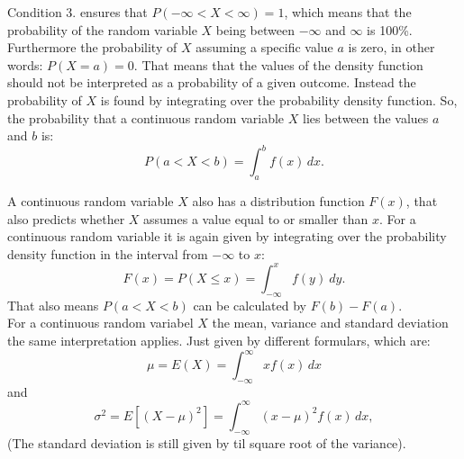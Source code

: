 \noindent Condition 3. ensures that $P(-\infty < X < \infty) = 1$, which means that the probability of the random variable $X$ being between $-\infty$ and $\infty$ is 100\%. Furthermore the probability of $X$ assuming a specific value $a$ is zero, in other words: $P(X=a)=0$. That means that the values of the density function should not be interpreted as a probability of a given outcome. Instead the probability of $X$ is found by integrating over the probability density function. So, the probability that a continuous random variable $X$ lies between the values $a$ and $b$ is: 
$$P(a < X < b) = \int_a^b f(x) \, dx.$$

\noindent A continuous random variable $X$ also has a distribution function $F(x)$, that also predicts whether $X$ assumes a value equal to or smaller than $x$. For a continuous random variable it is again given by integrating over the probability density function in the interval from $-\infty$ to $x$:
$$F(x) = P(X \leq x) = \int_{-\infty}^{x} f(y) \ dy.$$
That also means $P(a<X<b)$ can be calculated by $F(b)-F(a)$.
\\

\noindent For a continuous random variabel $X$ the mean, variance and standard deviation the same interpretation applies. Just given by different formulars, which are:
$$\mu = E(X) = \int_{-\infty}^{\infty} x f(x) \, dx$$
and
$$\sigma^2 = E\left[(X - \mu)^2\right] = \int_{-\infty}^{\infty} (x - \mu)^2 f(x) \, dx,$$
(The standard deviation is still given by til square root of the variance).